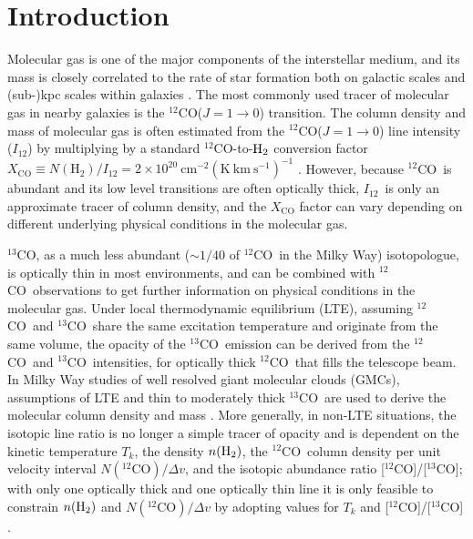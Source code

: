 \documentclass{emulateapj}
\def\ttco{\mbox{$^{13}$CO}}
\def\twco{\mbox{$^{12}$CO}}
\def\itw{$I_{12}$}
\begin{document}


\section{Introduction}  \label{sec:intro}
Molecular gas is one of the major components of the interstellar medium,
and its mass is closely correlated to the rate of star formation both on galactic scales \citep[e.g.][]{Kennicutt1998, Gao2004, Evans2006}
and (sub-)kpc scales within galaxies \citep[e.g.][]{Wong2002, Bigiel2008, Rahman2012, Leroy2013}.
The most commonly used tracer of molecular gas in nearby galaxies is the
\twco($J = 1 \rightarrow 0$) transition.
The column density and mass of molecular gas is often estimated from the 
\twco($J = 1 \rightarrow 0$) line intensity (\itw)
by multiplying by a standard \twco-to-$\rm H_2$ conversion factor 
$X_{\mathrm{CO}} \equiv N(\mathrm{H_2})/I_{12} = 2 \times 10^{20}\
 \mathrm{cm^{-2} (K \ km \ s^{-1})^{-1}} $ \citep{Young1982, pbook, Bolatto2013}.
However,  because \twco \  is abundant and
its low level transitions are often optically thick,
\itw \ is only an approximate tracer of column density,
and the $X_{\mathrm{CO}}$ factor can vary depending on 
different underlying physical conditions in the molecular gas. 

\ttco, as a much less abundant ($\sim 1/40$ of \twco \ in the Milky Way) isotopologue, 
is optically thin in most environments,
and can be combined with \twco \ observations to get further information on 
physical conditions in the molecular gas.
Under local thermodynamic equilibrium (LTE), assuming \twco \  and \ttco \ share the same excitation temperature and
originate from the same volume, the opacity of the \ttco \ emission can be derived from the \twco \ and \ttco \ intensities, for optically thick \twco\ that fills the telescope beam.
In Milky Way studies of well resolved giant molecular clouds (GMCs), 
assumptions of LTE and thin to moderately thick \ttco \ are used to derive
the molecular column density and mass \citep[e.g.][]{Goldsmith2008, Roman-Duval2016}.  
More generally, in non-LTE situations, the isotopic line ratio is no longer a simple tracer of opacity and is dependent on the kinetic temperature $T_k$, the density $n({\rm H}_2)$, the \twco\ column density per unit velocity interval $N(\twco)/\Delta v$, and the isotopic abundance ratio [\twco]/[\ttco]; with only one optically thick and one optically thin line it is only feasible to constrain $n({\rm H}_2)$ and $N(\twco)/\Delta v$ by adopting values for $T_k$ and [\twco]/[\ttco] \citep[e.g.,][]{Hirota2010}.
\end{document}
